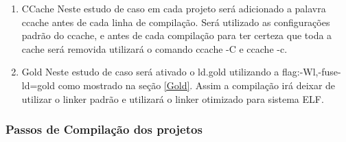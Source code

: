         \begin{enumerate}
               \item CCache
                    \subitem Neste estudo de caso em cada projeto será adicionado
 a palavra ccache antes de cada linha de compilação. Será utilizado as
 configurações padrão do ccache, e antes de cada compilação para ter certeza
 que toda a cache será removida utilizará o comando ccache -C e ccache -c.
                \item Gold
                    \subitem Neste estudo de caso será ativado o ld.gold
 utilizando a flag:-Wl,-fuse-ld=gold como mostrado na seção \ref{Gold}. Assim  a
 compilação irá deixar de utilizar o linker padrão e utilizará o linker
 otimizado para sistema ELF.
        \end{enumerate}

\subsubsection{Passos de Compilação dos projetos}


